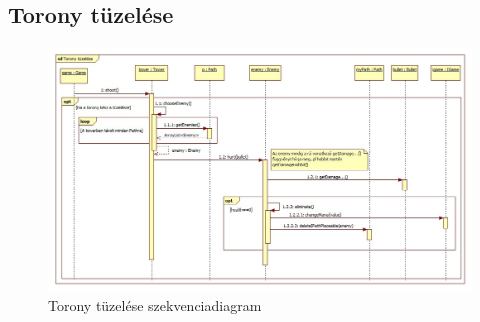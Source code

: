 \subsection{Torony tüzelése}
\begin{figure}[H]
\begin{center}
\includegraphics[width=17cm]{chapters/chapter04/images/Torony_tuzelese.jpg}
\caption{Torony tüzelése szekvenciadiagram}
\label{fig:Torony_tüzelése}
\end{center}
\end{figure}

